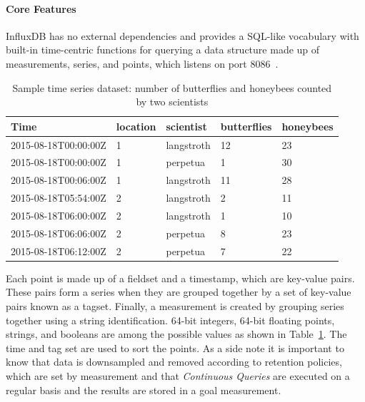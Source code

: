 \paragraph{Core Features}
InfluxDB has no external dependencies and provides a SQL-like vocabulary with built-in time-centric functions for querying a data structure made up of measurements, series, and points, which listens on port 8086~\cite{Misc:influx_docs}.

\begin{table}[ht]
    \centering
    \begin{tabular}{|l|l|l|l|l|}
        \toprule
        Time                 & location & scientist  & butterflies & honeybees \\ \midrule
        2015-08-18T00:00:00Z & 1        & langstroth & 12          & 23        \\ \hline
        2015-08-18T00:00:00Z & 1        & perpetua   & 1           & 30        \\ \hline
        2015-08-18T00:06:00Z & 1        & langstroth & 11          & 28        \\ \hline
        2015-08-18T05:54:00Z & 2        & langstroth & 2           & 11        \\ \hline
        2015-08-18T06:00:00Z & 2        & langstroth & 1           & 10        \\ \hline
        2015-08-18T06:06:00Z & 2        & perpetua   & 8           & 23        \\ \hline
        2015-08-18T06:12:00Z & 2        & perpetua   & 7           & 22        \\ \bottomrule
    \end{tabular}
    \caption{Sample time series dataset: number of butterflies and honeybees counted by two scientists}\label{tab:influx_example}
\end{table}

Each point is made up of a fieldset and a timestamp, which are key-value pairs. These pairs form a series when they are grouped together by a set of key-value pairs known as a tagset. Finally, a measurement is created by grouping series together using a string identification.
64-bit integers, 64-bit floating points, strings, and booleans are among the possible values as shown in Table~\ref{tab:influx_example}. The time and tag set are used to sort the points.
As a side note it is important to know that data is downsampled and removed according to retention policies, which are set by measurement and that \textit{Continuous Queries} are executed on a regular basis and the results are stored in a goal measurement.

